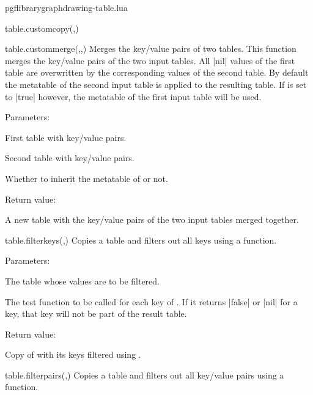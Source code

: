 \begin{filedescription}{pgflibrarygraphdrawing-table.lua}
\begin{luacommand}{{table.custom\textunderscore{}copy}(,)}
\end{luacommand}
\begin{luacommand}{{table.custom\textunderscore{}merge}(,,)}
Merges the key/value pairs of two tables.  This function merges the key/value pairs of the two input tables.  All |nil| values of the first table are overwritten by the corresponding values of the second table.  By default the metatable of the second input table is applied to the resulting table. If  is set to |true| however, the metatable of the first input table will be used. 

Parameters:
\begin{parameterdescription}
	\item[\meta{table1}] First table with key/value pairs.\item[\meta{table2}] Second table with key/value pairs.\item[\meta{first\_metatable}] Whether to inherit the metatable of  or not. 
\end{parameterdescription}


Return value:
\begin{parameterdescription} 
  \item[] A new table with the key/value pairs of the two input tables merged together. 
\end{parameterdescription}


\end{luacommand}
\begin{luacommand}{{table.filter\textunderscore{}keys}(,)}
Copies a table and filters out all keys using a function. 

Parameters:
\begin{parameterdescription}
	\item[\meta{table}] The table whose values are to be filtered.\item[\meta{filter\_func}] The test function to be called for each key of . If it returns |false| or |nil| for a key, that key will not be part of the result table. 
\end{parameterdescription}


Return value:
\begin{parameterdescription} 
  \item[] Copy of  with its keys filtered using . 
\end{parameterdescription}


\end{luacommand}
\begin{luacommand}{{table.filter\textunderscore{}pairs}(,)}
Copies a table and filters out all key/value pairs using a function. 


\end{luacommand}
\end{filedescription}
